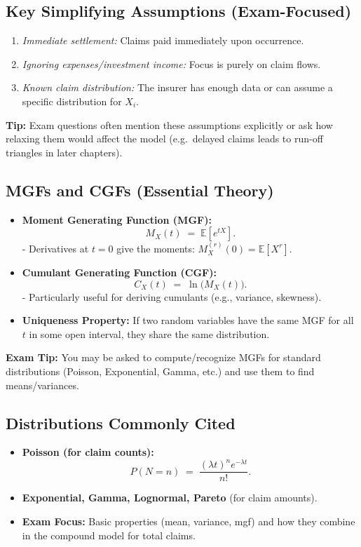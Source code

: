 \documentclass[13pt,a4paper]{article}
\begin{document}
\subsection{Key Simplifying Assumptions (Exam-Focused)}
\begin{enumerate}
  \item \emph{Immediate settlement:} Claims paid immediately upon occurrence.
  \item \emph{Ignoring expenses/investment income:} Focus is purely on claim flows.
  \item \emph{Known claim distribution:} The insurer has enough data or can assume a specific distribution for \(X_i\).
\end{enumerate}
\textbf{Tip:} Exam questions often mention these assumptions explicitly or ask how relaxing them would affect the model (e.g.\ delayed claims leads to run-off triangles in later chapters).

\subsection{MGFs and CGFs (Essential Theory)}
\begin{itemize}
  \item \textbf{Moment Generating Function (MGF):} 
  \[
    M_X(t) \;=\; \mathbb{E}[e^{tX}].
  \]
    - Derivatives at \(t=0\) give the moments: \(M_X^{(r)}(0)=\mathbb{E}[X^r]\).
  \item \textbf{Cumulant Generating Function (CGF):} 
  \[
    C_X(t) \;=\; \ln\bigl(M_X(t)\bigr).
  \]
    - Particularly useful for deriving cumulants (e.g., variance, skewness).
  \item \textbf{Uniqueness Property:} If two random variables have the same MGF for all \(t\) in some open interval, they share the same distribution.
\end{itemize}
\textbf{Exam Tip:} You may be asked to compute/recognize MGFs for standard distributions (Poisson, Exponential, Gamma, etc.) and use them to find means/variances.

\subsection{Distributions Commonly Cited}
\begin{itemize}
  \item \textbf{Poisson (for claim counts):} 
    \[
      P(N=n) \;=\; \frac{(\lambda t)^n e^{-\lambda t}}{n!}.
    \]
  \item \textbf{Exponential, Gamma, Lognormal, Pareto} (for claim amounts). 
  \item \textbf{Exam Focus:} Basic properties (mean, variance, mgf) and how they combine in the compound model for total claims.
\end{itemize}
\end{document}
